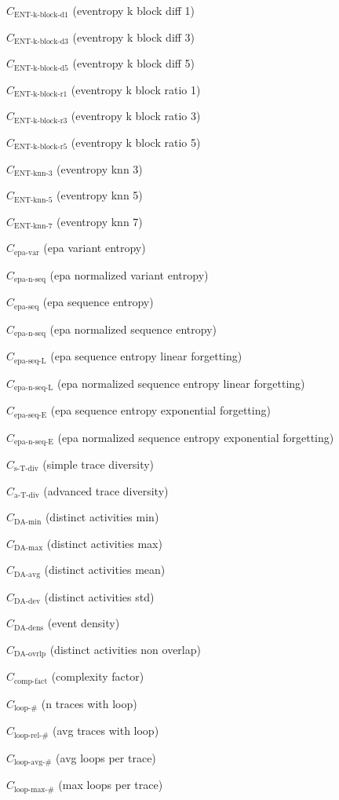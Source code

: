 \documentclass[a4paper]{article}
\newcommand{\daminname}{\text{DA-min}}
\newcommand{\damin}{C_{\daminname}}
\newcommand{\daavgname}{\text{DA-avg}}
\newcommand{\daavg}{C_{\daavgname}}
\newcommand{\damaxname}{\text{DA-max}}
\newcommand{\damax}{C_{\damaxname}}
\newcommand{\dadevname}{\text{DA-dev}}
\newcommand{\dadev}{C_{\dadevname}}
\newcommand{\dadensname}{\text{DA-dens}}
\newcommand{\dadens}{C_{\dadensname}}
\newcommand{\daoverlapname}{\text{DA-ovrlp}}
\newcommand{\daoverlap}{C_{\daoverlapname}}
\newcommand{\complexityfactorname}{\text{comp-fact}}
\newcommand{\complexityfactor}{C_{\complexityfactorname}}
\newcommand{\simpletracedivname}{\text{s-T-div}}
\newcommand{\simpletracediv}{C_{\simpletracedivname}}
\newcommand{\advtracedivname}{\text{a-T-div}}
\newcommand{\advtracediv}{C_{\advtracedivname}}
\newcommand{\loopnumname}{\text{loop-\#}}
\newcommand{\loopnum}{C_{\loopnumname}}
\newcommand{\looprelnumname}{\text{loop-rel-\#}}
\newcommand{\looprelnum}{C_{\looprelnumname}}
\newcommand{\loopavgname}{\text{loop-avg-\#}}
\newcommand{\loopavg}{C_{\loopavgname}}
\newcommand{\loopmaxname}{\text{loop-max-\#}}
\newcommand{\loopmax}{C_{\loopmaxname}}
\newcommand{\entkblockdonename}{\text{ENT-k-block-d1}}
\newcommand{\entkblockdone}{C_{\entkblockdonename}}
\newcommand{\entkblockdthreename}{\text{ENT-k-block-d3}}
\newcommand{\entkblockdthree}{C_{\entkblockdthreename}}
\newcommand{\entkblockdfivename}{\text{ENT-k-block-d5}}
\newcommand{\entkblockdfive}{C_{\entkblockdfivename}}
\newcommand{\entkblockronename}{\text{ENT-k-block-r1}}
\newcommand{\entkblockrone}{C_{\entkblockronename}}
\newcommand{\entkblockrthreename}{\text{ENT-k-block-r3}}
\newcommand{\entkblockrthree}{C_{\entkblockrthreename}}
\newcommand{\entkblockrfivename}{\text{ENT-k-block-r5}}
\newcommand{\entkblockrfive}{C_{\entkblockrfivename}}
\newcommand{\entknnthreename}{\text{ENT-knn-3}}
\newcommand{\entknnthree}{C_{\entknnthreename}}
\newcommand{\entknnfivename}{\text{ENT-knn-5}}
\newcommand{\entknnfive}{C_{\entknnfivename}}
\newcommand{\entknnsevenname}{\text{ENT-knn-7}}
\newcommand{\entknnseven}{C_{\entknnsevenname}}
\newcommand{\epavariantname}{\text{epa-var}}
\newcommand{\epavariant}{C_{\epavariantname}}
\newcommand{\epanormvariant}{C_{\epanormsequencename}}
\newcommand{\epasequencename}{\text{epa-seq}}
\newcommand{\epasequence}{C_{\epasequencename}}
\newcommand{\epanormsequencename}{\text{epa-n-seq}}
\newcommand{\epanormsequence}{C_{\epanormsequencename}}
\newcommand{\epasequencelname}{\text{epa-seq-L}}
\newcommand{\epasequencel}{C_{\epasequencelname}}
\newcommand{\epanormsequencelname}{\text{epa-n-seq-L}}
\newcommand{\epanormsequencel}{C_{\epanormsequencelname}}
\newcommand{\epasequenceename}{\text{epa-seq-E}}
\newcommand{\epasequencee}{C_{\epasequenceename}}
\newcommand{\epanormsequenceename}{\text{epa-n-seq-E}}
\newcommand{\epanormsequencee}{C_{\epanormsequenceename}}
\begin{document}
\begin{compactenum}
\item $\entkblockdone$ (eventropy k block diff 1)
\item $\entkblockdthree$ (eventropy k block diff 3)
\item $\entkblockdfive$ (eventropy k block diff 5)
\item $\entkblockrone$ (eventropy k block ratio 1)
\item $\entkblockrthree$ (eventropy k block ratio 3)
\item $\entkblockrfive$ (eventropy k block ratio 5)
\item $\entknnthree$ (eventropy knn 3)
\item $\entknnfive$ (eventropy knn 5)
\item $\entknnseven$ (eventropy knn 7)
\item $\epavariant$ (epa variant entropy)
\item $\epanormvariant$ (epa normalized variant entropy)
\item $\epasequence$ (epa sequence entropy)
\item $\epanormsequence$ (epa normalized sequence entropy)
\item $\epasequencel$ (epa sequence entropy linear forgetting)
\item $\epanormsequencel$ (epa normalized sequence entropy linear forgetting)
\item $\epasequencee$ (epa sequence entropy exponential forgetting)
\item $\epanormsequencee$ (epa normalized sequence entropy exponential forgetting)
\item $\simpletracediv$ (simple trace diversity)
\item $\advtracediv$ (advanced trace diversity)
\item $\damin$ (distinct activities min)
\item $\damax$ (distinct activities max)
\item $\daavg$ (distinct activities mean)
\item $\dadev$ (distinct activities std)
\item $\dadens$ (event density)
\item $\daoverlap$ (distinct activities non overlap)
\item $\complexityfactor$ (complexity factor)
\item $\loopnum$ (n traces with loop)
\item $\looprelnum$ (avg traces with loop)
\item $\loopavg$ (avg loops per trace)
\item $\loopmax$ (max loops per trace)

\end{compactenum}
\end{document}
